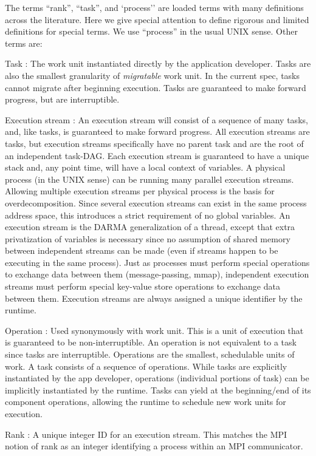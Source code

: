 The terms ``rank'', ``task'', and `process'' are loaded terms with many definitions across the literature. 
Here we give special attention to define rigorous and limited definitions for special terms.
We use ``process'' in the usual UNIX sense. Other terms are:
\begin{compactdesc}
\item [Task]: The work unit instantiated directly by the application developer. 
Tasks are also the smallest granularity of \emph{migratable} work unit. 
In the current spec, tasks cannot migrate after beginning execution.
Tasks are guaranteed to make forward progress, but are interruptible.
\item [Execution stream]: An execution stream will consist of a sequence of many tasks, and, like tasks, is guaranteed to make forward progress.
All execution streams are tasks, but execution streams specifically have no parent task and are the root of an independent task-DAG.
Each execution stream is guaranteed to have a unique stack and, any point time, will have a local context of variables.
A physical process (in the UNIX sense) can be running many parallel execution streams.
Allowing multiple execution streams per physical process is the basis for overdecomposition.
Since several execution streams can exist in the same process address space, this introduces a strict requirement of no global variables.
An execution stream is the DARMA generalization of a thread, except that extra privatization of variables is necessary since no assumption of shared memory between independent streams can be made (even if streams happen to be executing in the same process).
Just as processes must perform special operations to exchange data between them (message-passing, mmap), independent execution streams must perform special key-value store operations to exchange data between them.
Execution streams are always assigned a unique identifier by the runtime.
\item [Operation]: Used synonymously with work unit. This is a unit of execution that is guaranteed to be non-interruptible. 
An operation is not equivalent to a task since tasks are interruptible.  
Operations are the smallest, schedulable units of work.  
A task consists of a sequence of operations.
While tasks are explicitly instantiated by the app developer, operations (individual portions of task) can be implicitly instantiated by the runtime.
Tasks can yield at the beginning/end of its component operations, allowing the runtime to schedule new work units for execution.
\item [Rank]: A unique integer ID for an execution stream. This matches the MPI notion of rank as an integer identifying a process within an MPI communicator.

\end{compactdesc}
